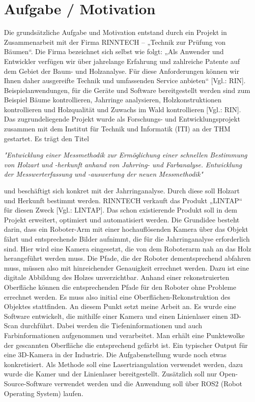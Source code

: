 \section{Aufgabe / Motivation}
Die grundsätzliche Aufgabe und Motivation entstand durch ein Projekt in Zusammenarbeit mit der Firma RINNTECH – „Technik zur Prüfung von Bäumen“. Die Firma bezeichnet sich selbst wie folgt: „Als Anwender und Entwickler verfügen wir über jahrelange Erfahrung und zahlreiche Patente auf dem Gebiet der Baum- und Holzanalyse. Für diese Anforderungen können wir Ihnen daher ausgereifte Technik und umfassenden Service anbieten“ [Vgl.: RIN]. Beispielanwendungen, für die Geräte und Software bereitgestellt werden sind zum Beispiel Bäume kontrollieren, Jahrringe analysieren, Holzkonstruktionen kontrollieren und Holzqualität und Zuwachs im Wald kontrollieren [Vgl.:  RIN]. Das zugrundeliegende Projekt wurde als Forschungs- und Entwicklungsprojekt zusammen mit dem Institut für Technik und Informatik (ITI) an der THM gestartet. Es trägt den Titel

\textit{"Entwicklung einer Messmethodik zur Ermöglichung einer schnellen Bestimmung von Holzart und -herkunft anhand von Jahrring- und Farbanalyse. Entwicklung der Messwerterfassung und -auswertung der neuen Messmethodik"}

und beschäftigt sich konkret mit der Jahrringanalyse. Durch diese soll Holzart und Herkunft bestimmt werden. RINNTECH verkauft das Produkt „LINTAP“ für diesen Zweck [Vgl.: LINTAP]. Das schon existierende Produkt soll in dem Projekt erweitert, optimiert und automatisiert werden. Die Grundidee besteht darin, dass ein Roboter-Arm mit einer hochauflösenden Kamera über das Objekt fährt und entsprechende Bilder aufnimmt, die für die Jahrringanalyse erforderlich sind. Hier wird eine Kamera eingesetzt, die von dem Roboterarm nah an das Holz herangeführt werden muss. Die Pfade, die der Roboter dementsprechend abfahren muss, müssen also mit hinreichender Genauigkeit errechnet werden. Dazu ist eine digitale Abbildung des Holzes unverzichtbar. Anhand einer rekonstruierten Oberfläche können die entsprechenden Pfade für den Roboter ohne Probleme errechnet werden. Es muss also initial eine Oberflächen-Rekonstruktion des Objektes stattfinden. An diesem Punkt setzt meine Arbeit an. Es wurde eine Software entwickelt, die mithilfe einer Kamera und einen Linienlaser einen 3D-Scan durchführt. Dabei werden die Tiefeninformationen und auch Farbinformationen aufgenommen und verarbeitet. Man erhält eine Punktewolke der gescannten Oberfläche die entsprechend gefärbt ist. Ein typischer Output für eine 3D-Kamera in der Industrie. Die Aufgabenstellung wurde noch etwas konkretisiert. Als Methode soll eine Lasertriangulation verwendet werden, dazu wurde die Kamer und der Linienlaser bereitgestellt. Zusätzlich soll nur Open-Source-Software verwendet werden und die Anwendung soll über ROS2 (Robot Operating System) laufen.